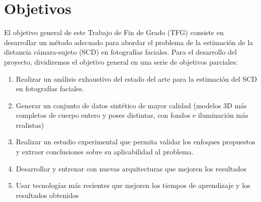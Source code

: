 \section{Objetivos}
El objetivo general de este Trabajo de Fin de Grado (TFG) consiste en desarrollar un método adecuado para abordar el problema de la estimación de la distancia cámara-sujeto (SCD) en  fotografías faciales. Para el desarrollo del proyecto, dividiremos el objetivo general en una serie de objetivos parciales:
\begin{enumerate}
    \item Realizar un análisis exhaustivo del estado del arte para la estimación del SCD en fotografías faciales.
    \item Generar un conjunto de datos sintético de mayor calidad (modelos 3D más completos de cuerpo entero y poses distintas, con fondos e iluminación más realistas)
    \item Realizar un estudio experimental que permita validar los enfoques propuestos y extraer conclusiones sobre su aplicabilidad al problema.
    \item Desarrollar y entrenar con nuevas arquitecturas que mejoren los resultados
    \item Usar tecnologías más recientes que mejoren los tiempos de aprendizaje y los resultados obtenidos
\end{enumerate}